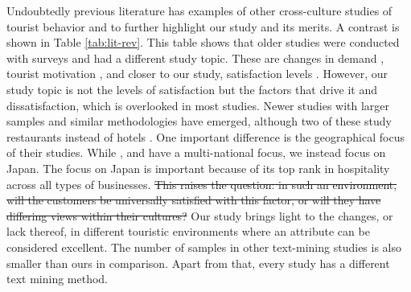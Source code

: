 \documentclass[smallextended,natbib]{svjour3}       %
\providecommand{\DIFadd}[1]{{\protect\color{blue}\uwave{#1}}} %
\providecommand{\DIFdel}[1]{{\protect\color{red}\sout{#1}}}                      %
\providecommand{\DIFaddbegin}{} %
\providecommand{\DIFaddend}{} %
\providecommand{\DIFdelbegin}{} %
\providecommand{\DIFdelend}{} %
\newcommand{\DIFscaledelfig}{0.5}
\newlength{\DIFdelgraphicswidth} %
\newlength{\DIFdelgraphicsheight} %
\newcommand{\DIFaddincludegraphics}[2][]{{\color{blue}\fbox{\DIFOincludegraphics[#1]{#2}}}} %
\newcommand{\DIFdelincludegraphics}[2][]{%
\sbox{\DIFdelgraphicsbox}{\DIFOincludegraphics[#1]{#2}}%
\settoboxwidth{\DIFdelgraphicswidth}{\DIFdelgraphicsbox} %
\settoboxtotalheight{\DIFdelgraphicsheight}{\DIFdelgraphicsbox} %
\scalebox{\DIFscaledelfig}{%
\parbox[b]{\DIFdelgraphicswidth}{\usebox{\DIFdelgraphicsbox}\\[-\baselineskip] \rule{\DIFdelgraphicswidth}{0em}}\llap{\resizebox{\DIFdelgraphicswidth}{\DIFdelgraphicsheight}{%
\setlength{\unitlength}{\DIFdelgraphicswidth}%
\begin{picture}(1,1)%
\thicklines\linethickness{2pt} %
{\color[rgb]{1,0,0}\put(0,0){\framebox(1,1){}}}%
{\color[rgb]{1,0,0}\put(0,0){\line( 1,1){1}}}%
{\color[rgb]{1,0,0}\put(0,1){\line(1,-1){1}}}%
\end{picture}%
}\hspace*{3pt}}} %
} %
\DeclareRobustCommand{\DIFaddbegin}{\DIFOaddbegin \let\includegraphics\DIFaddincludegraphics} %
\DeclareRobustCommand{\DIFaddend}{\DIFOaddend \let\includegraphics\DIFOincludegraphics} %
\DeclareRobustCommand{\DIFdelbegin}{\DIFOdelbegin \let\includegraphics\DIFdelincludegraphics} %
\DeclareRobustCommand{\DIFdelend}{\DIFOaddend \let\includegraphics\DIFOincludegraphics} %
\begin{document}
    Undoubtedly previous literature has examples of other cross-culture studies of tourist behavior and \DIFaddbegin \DIFadd{may serve }\DIFaddend to further highlight our study and its merits. A contrast is shown in Table \ref{tab:lit-rev}. This table shows that older studies were conducted with surveys and had a different study topic. These are changes in demand \cite[][]{bauer1993changing}, tourist motivation \cite[][]{kim2000}, and closer to our study, satisfaction levels \cite[][]{choi2000}. However, our study topic is not the levels of satisfaction but the factors that drive it and dissatisfaction, which is overlooked in most studies. Newer studies with larger samples and similar methodologies have emerged, although two of these study restaurants instead of hotels \cite[][]{JIA2020104071, HUANG2017117}. One important difference is the geographical focus of their studies. While \cite{FRANCESCO201924} , \cite{JIA2020104071} and \cite{HUANG2017117} have a multi-national focus, we instead focus on Japan. The focus on Japan is important because of its top rank in hospitality across all types of businesses. \DIFdelbegin \DIFdel{This raises the question: in such an environment, will the customers be universally satisfied with this factor, or will they have differing views within their cultures? }\DIFdelend Our study brings light to the changes, or lack thereof, in different touristic environments where an attribute can be considered excellent. The number of samples in other text-mining studies is also smaller than ours in comparison. Apart from that, every study has a different text mining method.
\end{document}
